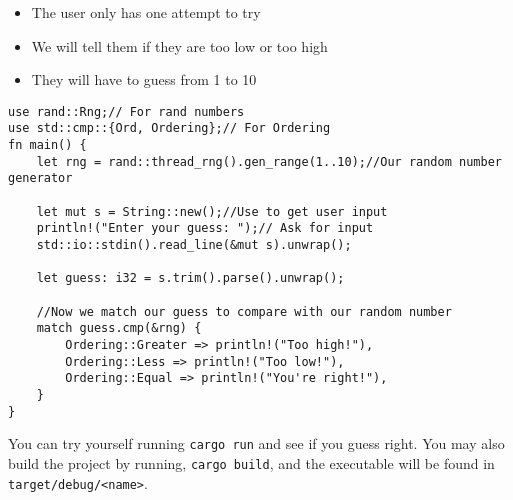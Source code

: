 \begin{itemize}
    \item The user only has one attempt to try
    \item We will tell them if they are too low or too high
    \item They will have to guess from 1 to 10
\end{itemize}

\lstset{style=mystyle}
\begin{lstlisting}
use rand::Rng;// For rand numbers
use std::cmp::{Ord, Ordering};// For Ordering 
fn main() {
    let rng = rand::thread_rng().gen_range(1..10);//Our random number generator

    let mut s = String::new();//Use to get user input
    println!("Enter your guess: ");// Ask for input
    std::io::stdin().read_line(&mut s).unwrap();

    let guess: i32 = s.trim().parse().unwrap();

    //Now we match our guess to compare with our random number
    match guess.cmp(&rng) {
        Ordering::Greater => println!("Too high!"),
        Ordering::Less => println!("Too low!"),
        Ordering::Equal => println!("You're right!"),
    }
}
\end{lstlisting}
You can try yourself running \verb!cargo run! and see if you guess right. You may also build 
the project by running, \verb!cargo build!, and the executable will be found in \verb!target/debug/<name>!. 